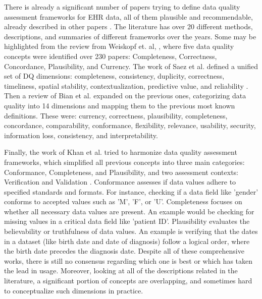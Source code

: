 
There is already a significant number of papers trying to define data quality assessment frameworks for EHR data, all of them plausible and recommendable, already described in other papers \cite{bianAssessingPracticeData2020}. The literature has over 20 different methods, descriptions, and summaries of different frameworks over the years. Some may be highlighted from the review from Weiskopf et. al, \cite{weiskopfMethodsDimensionsElectronic2013}, where five data quality concepts were identified over 230 papers: Completeness, Correctness, Concordance, Plausibility, and Currency. 
The work of Saez et al. defined a unified set of DQ dimensions: completeness, consistency, duplicity, correctness, timeliness, spatial stability, contextualization, predictive value, and reliability \cite{saezOrganizingDataQuality2012}. Then a review of Bian et al. \cite{bianAssessingPracticeData2020} expanded on the previous ones, categorizing data quality into 14 dimensions and mapping them to the previous most known definitions. These were: currency, correctness, plausibility, completeness, concordance, comparability, conformance, flexibility, relevance, usability, security, information loss, consistency, and interpretability.

Finally, the work of Khan et al. tried to harmonize data quality assessment frameworks, which simplified all previous concepts into three main categories: Conformance, Completeness, and Plausibility, and two assessment contexts: Verification and Validation \cite{kahnHarmonizedDataQuality2016a}. Conformance  assesses if data values adhere to specified standards and formats. For instance, checking if a data field like 'gender' conforms to accepted values such as 'M', 'F', or 'U'. Completeness focuses on whether all necessary data values are present. An example would be checking for missing values in a critical data field like 'patient ID'. Plausibility evaluates the believability or truthfulness of data values. An example is verifying that the dates in a dataset (like birth date and date of diagnosis) follow a logical order, where the birth date precedes the diagnosis date. Despite all of these comprehensive works, there is still no consensus regarding which one is best or which has taken the lead in usage. Moreover, looking at all of the descriptions related in the literature, a significant portion of concepts are overlapping, and sometimes hard to conceptualize such dimensions in practice.


